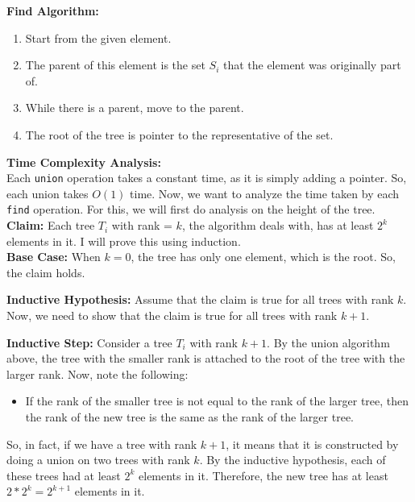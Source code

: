 \documentclass[a4paper]{article}
\begin{document}
\begin{enumerate}
    \textbf{Find Algorithm:}
    \begin{enumerate}[label=\arabic*.]
        \item Start from the given element.
        \item The parent of this element is the set $S_i$ that the element was originally part of.
        \item While there is a parent, move to the parent.
        \item The root of the tree is pointer to the representative of the set.\\
    \end{enumerate}

    \textbf{Time Complexity Analysis:}\\
    Each \texttt{union} operation takes a constant time, as it is simply adding a pointer. So, each union takes $O(1)$ time. Now, we want to analyze the time taken by each \texttt{find} operation. For this, we will first do analysis on the height of the tree.\\

    \textbf{Claim:} Each tree $T_i$ with rank = $k$, the algorithm deals with, has at least $2^k$ elements in it. I will prove this using induction.\\

    \textbf{Base Case:}
    When $k = 0$, the tree has only one element, which is the root. So, the claim holds.

    \textbf{Inductive Hypothesis:}
    Assume that the claim is true for all trees with rank $k$. Now, we need to show that the claim is true for all trees with rank $k+1$.

    \textbf{Inductive Step:}
    Consider a tree $T_i$ with rank $k+1$. By the union algorithm above, the tree with the smaller rank is attached to the root of the tree with the larger rank. Now, note the following:

    \begin{itemize}
        \item If the rank of the smaller tree is not equal to the rank of the larger tree, then the rank of the new tree is the same as the rank of the larger tree.
    \end{itemize}

    So, in fact, if we have a tree with rank $k+1$, it means that it is constructed by doing a union on two trees with rank $k$. By the inductive hypothesis, each of these trees had at least $2^k$ elements in it. Therefore, the new tree has at least $2 * 2^k = 2^{k+1}$ elements in it.


\end{enumerate}
\end{document}
